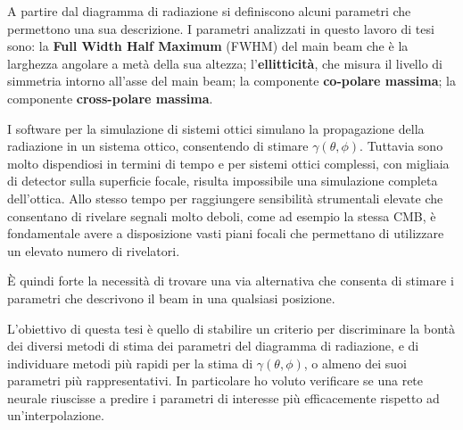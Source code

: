 \documentclass[12pt,a4paper,final]{report}			%
\begin{document}

A partire dal diagramma di radiazione si definiscono alcuni parametri che permettono una sua descrizione. I parametri analizzati in questo lavoro di tesi sono: la \textbf{Full Width Half Maximum} (FWHM) del main beam che è la larghezza angolare a metà della sua altezza; l'\textbf{ellitticità}, che misura il livello di simmetria intorno all'asse del main beam; la componente \textbf{co-polare massima}; la componente \textbf{cross-polare massima}.



I software per la simulazione di sistemi ottici simulano la propagazione della radiazione in un sistema ottico, consentendo di stimare $\gamma(\theta, \phi)$. 
Tuttavia sono molto dispendiosi in termini di tempo e per sistemi ottici complessi, con migliaia di detector sulla superficie focale, risulta impossibile una simulazione completa dell'ottica.
Allo stesso tempo per raggiungere sensibilità strumentali elevate che consentano di rivelare segnali molto deboli, come ad esempio la stessa CMB, è fondamentale avere a disposizione vasti piani focali che permettano di utilizzare un elevato numero di rivelatori.

\`E quindi forte la necessità di trovare una via alternativa che consenta di stimare i parametri che descrivono il beam in una qualsiasi posizione.

L'obiettivo di questa tesi è quello di stabilire un criterio per discriminare la bontà dei diversi metodi di stima dei parametri del diagramma di radiazione, e di individuare metodi più rapidi per la stima di $\gamma(\theta, \phi)$, o almeno dei suoi parametri più rappresentativi. In particolare ho voluto verificare se una rete neurale riuscisse a predire i parametri di interesse più efficacemente rispetto ad un'interpolazione.
\end{document}
